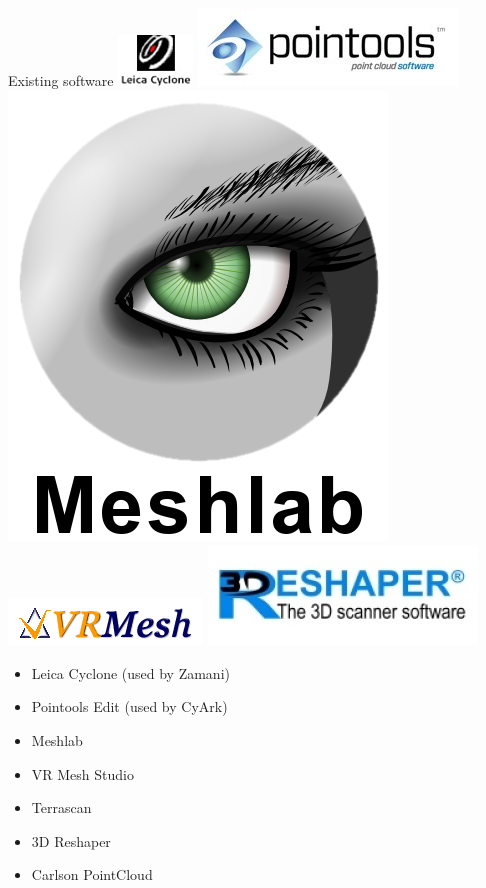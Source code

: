 \documentclass{beamer}
\begin{document}
\begin{frame}{Existing software}
\includegraphics[height=0.10\textheight]{pics/cyclone.jpg}
\includegraphics[height=0.10\textheight]{pics/pointools.jpg}
\includegraphics[height=0.10\textheight]{pics/meshlab.png}
\includegraphics[height=0.10\textheight]{pics/vrmesh.png}
\includegraphics[height=0.10\textheight]{pics/3dreshaper.jpg}

\begin{itemize}
\item Leica Cyclone (used by Zamani)
\item Pointools Edit (used by CyArk)
\item Meshlab
\item VR Mesh Studio
\item Terrascan
\item 3D Reshaper
\item Carlson PointCloud
\end{itemize}

\end{frame}
\end{document}
